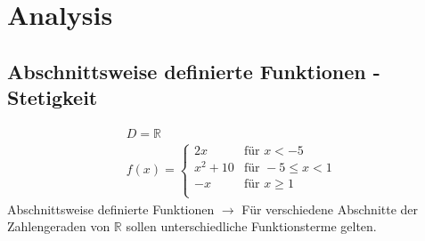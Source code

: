\chapter{Analysis}
\section{Abschnittsweise definierte Funktionen - Stetigkeit}
\begin{gather*}
  D = \mathbb{R} \\
  f(x) =
  \begin{cases}
    2x & \text{für } x < -5 \\
    x^2 + 10 & \text{für } -5 \leq x < 1 \\
    -x & \text{für } x \geq 1 \\
  \end{cases}
\end{gather*}
Abschnittsweise definierte Funktionen $\rightarrow$ Für verschiedene Abschnitte der Zahlengeraden von $\mathbb{R}$ sollen unterschiedliche Funktionsterme gelten. \\
